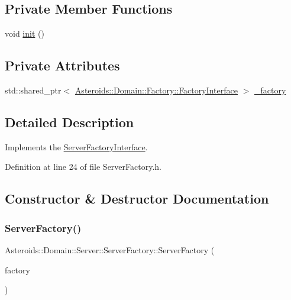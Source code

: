 \subsection*{Private Member Functions}
\begin{DoxyCompactItemize}
\item 
void \hyperlink{classAsteroids_1_1Domain_1_1Server_1_1ServerFactory_aa493ea3acf57b43b9c646bc950d1cbea}{init} ()
\end{DoxyCompactItemize}
\subsection*{Private Attributes}
\begin{DoxyCompactItemize}
\item 
std\+::shared\+\_\+ptr$<$ \hyperlink{classAsteroids_1_1Domain_1_1Factory_1_1FactoryInterface}{Asteroids\+::\+Domain\+::\+Factory\+::\+Factory\+Interface} $>$ \hyperlink{classAsteroids_1_1Domain_1_1Server_1_1ServerFactory_ae3febd57c09d282d0b95300bb86b9f9a}{\+\_\+factory}
\end{DoxyCompactItemize}


\subsection{Detailed Description}
Implements the \hyperlink{classAsteroids_1_1Domain_1_1Server_1_1ServerFactoryInterface}{Server\+Factory\+Interface}. 

Definition at line 24 of file Server\+Factory.\+h.



\subsection{Constructor \& Destructor Documentation}
\mbox{\label{classAsteroids_1_1Domain_1_1Server_1_1ServerFactory_a7de2a922987247b12190afb667d64fe4}} 
\subsubsection{\texorpdfstring{Server\+Factory()}{ServerFactory()}}
{\footnotesize\ttfamily Asteroids\+::\+Domain\+::\+Server\+::\+Server\+Factory\+::\+Server\+Factory (\begin{DoxyParamCaption}\item[{std\+::shared\+\_\+ptr$<$ \hyperlink{classAsteroids_1_1Domain_1_1Factory_1_1FactoryInterface}{Asteroids\+::\+Domain\+::\+Factory\+::\+Factory\+Interface} $>$}]{factory }\end{DoxyParamCaption})}



